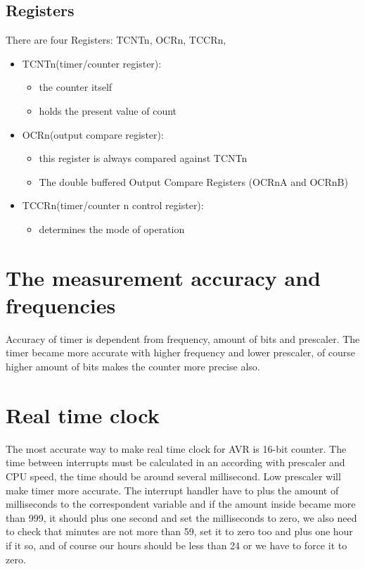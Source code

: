 \documentclass[english]{article}
\begin{document}
\subsection{Registers}
There are four Registers: TCNTn, OCRn, TCCRn, 
\begin{itemize}
\item TCNTn(timer/counter register):
	\begin{itemize}
	\item the counter itself
	\item holds the present value of count
	\end{itemize}

\item OCRn(output compare register):
	\begin{itemize}
	\item this register is always compared against TCNTn
	\item The double buffered Output Compare Registers (OCRnA and OCRnB)
	\end{itemize}
\item TCCRn(timer/counter n control register):
	\begin{itemize}
	\item determines the mode of operation
	\end{itemize}

\end{itemize}

\section{The measurement accuracy and frequencies}
Accuracy of timer is dependent from frequency, amount of bits and prescaler. The timer became more accurate with higher frequency and lower prescaler, of course higher amount of bits makes the counter more precise also.
\section{Real time clock}
The most accurate way to make real time clock for AVR is 16-bit counter. The time between interrupts must be calculated in an according with prescaler and CPU speed, the time should be around several millisecond. Low prescaler will make timer more accurate. The interrupt handler have to plus the amount of milliseconds to the correspondent variable and if the amount inside became more than 999, it should plus one second and set the milliseconds to zero, we also need to check that minutes are not more than 59, set it to zero too and plus one hour if it so, and of course our hours should be less than 24 or we have to force it to zero.
\end{document}
